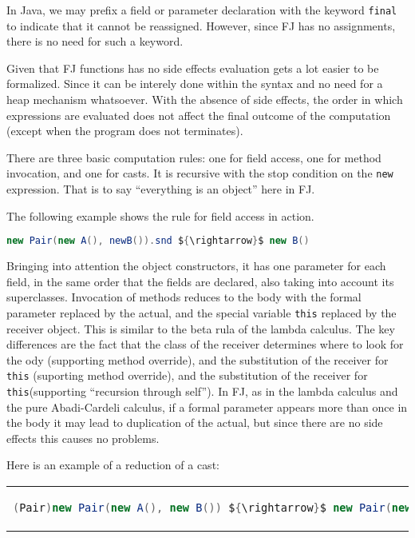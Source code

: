 In Java, we may prefix a field or parameter declaration with the keyword \texttt{final}
to indicate that it cannot be reassigned. However, since FJ has no assignments, there is
no need for such a keyword.

Given that FJ functions has no side effects evaluation gets a lot easier to be formalized.
Since it can be interely done within the syntax and no need for a heap mechanism whatsoever.
With the absence of side effects, the order in which expressions are evaluated does not affect
the final outcome of the computation (except when the program does not terminates).

There are three basic computation rules: one for field access, one for method
invocation, and one for casts.  It is recursive with the stop condition on the
\texttt{new} expression. That is to say ``everything is an object'' here in FJ.

The following example shows the rule for field access in action.

\begin{lstlisting}[language=Java, mathescape = true]
    new Pair(new A(), newB()).snd ${\rightarrow}$ new B()
\end{lstlisting}

Bringing into attention the object constructors, it has one parameter for each
field, in the same order that the fields are declared, also taking into account
its superclasses.  Invocation of methods reduces to the body with the formal
parameter replaced by the actual, and the special variable \texttt{this}
replaced by the receiver object. This is similar to the beta rula of the lambda
calculus. The key differences are the fact that the class of the receiver
determines where to look for the ody (supporting method override), and the
substitution of the receiver for \texttt{this} (suporting method override), and
the substitution of the receiver for \texttt{this}(supporting ``recursion
through self''). In FJ, as in the lambda calculus and the pure Abadi-Cardeli
calculus, if a formal parameter appears more than once in the body it may lead
to duplication of the actual, but since there are no side effects this causes
no problems.

Here is an example of a reduction of a cast:
\begin{center}
\begin{tabular}{c}
\begin{lstlisting}[language=Java, mathescape = true]
(Pair)new Pair(new A(), new B()) ${\rightarrow}$ new Pair(new A(), new B())
\end{lstlisting}
\end{tabular}
\end{center}

